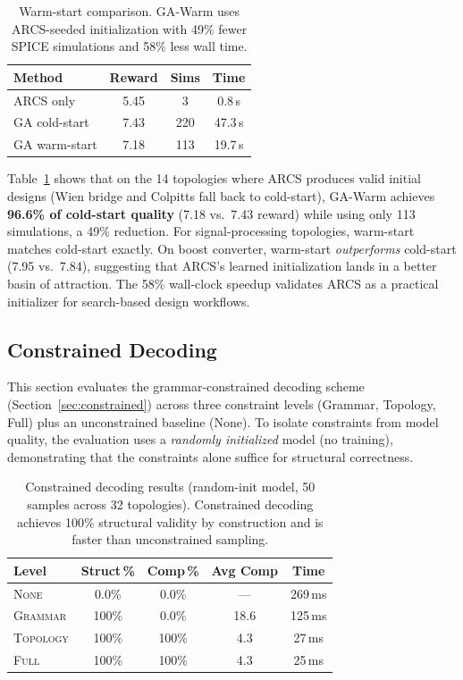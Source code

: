 \documentclass[conference]{IEEEtran}
\begin{document}
\begin{table}[t]
\centering
\caption{Warm-start comparison. GA-Warm uses ARCS-seeded initialization
with 49\% fewer SPICE simulations and 58\% less wall time.}
\label{tab:warmstart}
\begin{tabular}{@{}lccc@{}}
\toprule
Method & Reward & Sims & Time \\
\midrule
ARCS only     & 5.45 & 3   & 0.8\,s  \\
GA cold-start & 7.43 & 220 & 47.3\,s \\
GA warm-start & 7.18 & 113 & 19.7\,s \\
\bottomrule
\end{tabular}
\end{table}

Table~\ref{tab:warmstart} shows that on the 14 topologies where ARCS
produces valid initial designs (Wien bridge and Colpitts fall back to
cold-start), GA-Warm achieves \textbf{96.6\% of cold-start quality}
(7.18 vs.\ 7.43 reward) while using only 113 simulations, a 49\%
reduction. For signal-processing topologies, warm-start matches
cold-start exactly. On boost converter, warm-start
\emph{outperforms} cold-start (7.95 vs.\ 7.84), suggesting that
ARCS's learned initialization lands in a better basin of attraction.
The 58\% wall-clock speedup validates ARCS as a practical initializer
for search-based design workflows.

\subsection{Constrained Decoding}
\label{sec:constrained_results}

This section evaluates the grammar-constrained decoding scheme
(Section~\ref{sec:constrained}) across three constraint levels
(Grammar, Topology, Full) plus an unconstrained baseline (None).
To isolate constraints from model quality, the evaluation uses a
\emph{randomly initialized} model (no training),
demonstrating that the constraints alone suffice for structural
correctness.

\begin{table}[t]
\centering
\caption{Constrained decoding results (random-init model, 50 samples
across 32 topologies). Constrained decoding achieves 100\% structural
validity by construction and is faster than unconstrained sampling.}
\label{tab:constrained}
\begin{tabular}{@{}lcccc@{}}
\toprule
Level & Struct\,\% & Comp\,\% & Avg Comp & Time \\
\midrule
\textsc{None}     &  0.0\% &  0.0\% & ---  & 269\,ms \\
\textsc{Grammar}  & 100\%  &  0.0\% & 18.6 & 125\,ms \\
\textsc{Topology} & 100\%  & 100\%  & 4.3  & 27\,ms  \\
\textsc{Full}     & 100\%  & 100\%  & 4.3  & 25\,ms  \\
\bottomrule
\end{tabular}
\end{table}
\end{document}
